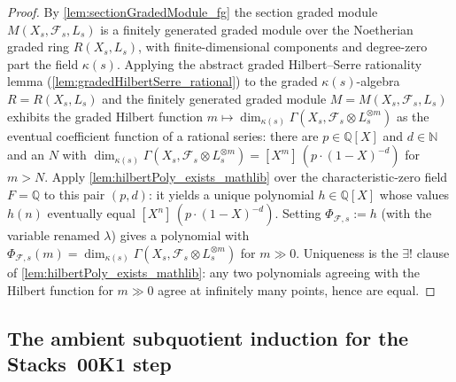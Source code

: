 \begin{proof}
  By \cref{lem:sectionGradedModule_fg} the section graded module
  \(M(X_s, \mathcal{F}_s, L_s)\) is a finitely generated graded module over the
  Noetherian graded ring \(R(X_s, L_s)\), with finite-dimensional components and
  degree-zero part the field \(\kappa(s)\). Applying the abstract graded
  Hilbert--Serre rationality lemma (\cref{lem:gradedHilbertSerre_rational}) to the
  graded \(\kappa(s)\)-algebra \(R = R(X_s, L_s)\) and the finitely generated
  graded module \(M = M(X_s, \mathcal{F}_s, L_s)\) exhibits the graded Hilbert
  function
  \(m \mapsto \dim_{\kappa(s)} \Gamma(X_s, \mathcal{F}_s \otimes L_s^{\otimes m})\)
  as the eventual coefficient function of a rational series: there are
  \(p \in \mathbb{Q}[X]\) and \(d \in \mathbb{N}\) and an \(N\) with
  \(\dim_{\kappa(s)} \Gamma(X_s, \mathcal{F}_s \otimes L_s^{\otimes m})
  = [X^m]\,(p \cdot (1 - X)^{-d})\) for \(m > N\). Apply
  \cref{lem:hilbertPoly_exists_mathlib} over the characteristic-zero field
  \(F = \mathbb{Q}\) to this pair \((p, d)\): it yields a unique polynomial
  \(h \in \mathbb{Q}[X]\) whose values \(h(n)\) eventually equal
  \([X^n]\,(p \cdot (1 - X)^{-d})\). Setting
  \(\Phi_{\mathcal{F},s} := h\) (with the variable renamed \(\lambda\)) gives a
  polynomial with \(\Phi_{\mathcal{F},s}(m) = \dim_{\kappa(s)}
  \Gamma(X_s, \mathcal{F}_s \otimes L_s^{\otimes m})\) for \(m \gg 0\). Uniqueness
  is the \(\exists!\) clause of \cref{lem:hilbertPoly_exists_mathlib}: any two
  polynomials agreeing with the Hilbert function for \(m \gg 0\) agree at
  infinitely many points, hence are equal.
\end{proof}

\subsection{The ambient subquotient induction for the Stacks~00K1 step}
\label{subsec:gradedModuleApi}

